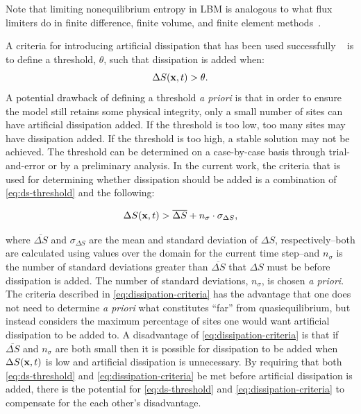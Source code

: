 \noindent Note that limiting nonequilibrium entropy in LBM is analogous to what flux limiters do in finite difference, finite volume, and finite element methods~\cite{brownlee2008nonequilibrium}.

A criteria for introducing artificial dissipation that has been used successfully ~\cite{gorban2014enhancement,brownlee2006stabilization,brownlee2007stability,brownlee2008nonequilibrium} is to define a threshold, $\theta$, such that dissipation is added when:
\begin{equation} \label{eq:ds-threshold}
  \Delta S(\mathbf{x}, t) > \theta.
\end{equation}
A potential drawback of defining a threshold \textit{a priori} is that in order to ensure the model still retains some physical integrity, only a small number of sites can have artificial dissipation added.
If the threshold is too low, too many sites may have dissipation added.
If the threshold is too high, a stable solution may not be achieved.
The threshold can be determined on a case-by-case basis through trial-and-error or by a preliminary analysis.
In the current work, the criteria that is used for determining whether dissipation should be added is a combination of \eqref{eq:ds-threshold} and the following:

\begin{equation} \label{eq:dissipation-criteria}
  \Delta S(\mathbf{x}, t) > \overline{\Delta S} + n_\sigma \cdot \sigma_{\Delta S},
\end{equation}

\noindent where $\overline{\Delta S}$ and $\sigma_{\Delta S}$ are the mean and standard deviation of $\Delta S$, respectively--both are calculated using values over the domain for the current time step--and $n_\sigma$ is the number of standard deviations greater than $\overline{\Delta S}$ that $\Delta S$ must be before dissipation is added.
The number of standard deviations, $n_\sigma$, is chosen \textit{a priori}.
The criteria described in \eqref{eq:dissipation-criteria} has the advantage that one does not need to determine \textit{a priori} what constitutes ``far'' from quasiequilibrium, but instead considers the maximum percentage of sites one would want artificial dissipation to be added to.
A disadvantage of \eqref{eq:dissipation-criteria} is that if $\overline{\Delta S}$ and $n_\sigma$ are both small then it is possible for dissipation to be added when $\Delta S(\mathbf{x}, t)$ is low and artificial dissipation is unnecessary.
By requiring that both \eqref{eq:ds-threshold} and \eqref{eq:dissipation-criteria} be met before artificial dissipation is added, there is the potential for \eqref{eq:ds-threshold} and \eqref{eq:dissipation-criteria} to compensate for the each other's disadvantage.

